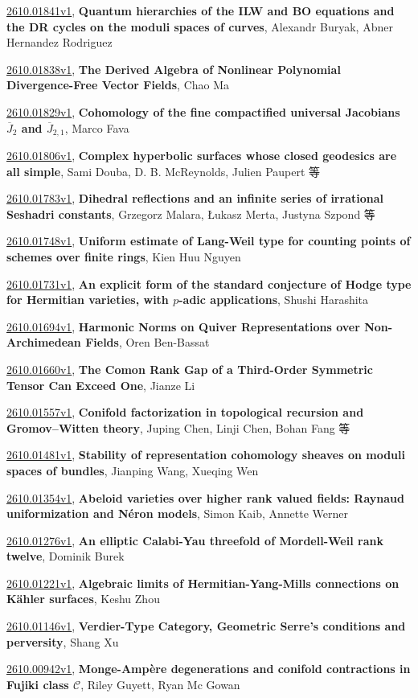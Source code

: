 \documentclass[9pt, a4paper]{article}
\theoremstyle{plain}
\theoremstyle{definition}
\theoremstyle{remark}
\newcommand{\arxiv}[3]{\href{https://arxiv.org/abs/#1}{#1}, \textbf{\textcolor{arxivblue}{#2}}, #3}
\begin{document}
\arxiv{2610.01841v1}{Quantum hierarchies of the ILW and BO equations and the DR cycles on the moduli spaces of curves}{Alexandr Buryak, Abner Hernandez Rodriguez}

\arxiv{2610.01838v1}{The Derived Algebra of Nonlinear Polynomial Divergence-Free Vector Fields}{Chao Ma}

\arxiv{2610.01829v1}{Cohomology of the fine compactified universal Jacobians $\overline{J}_2$ and $\overline{J}_{2,1}$}{Marco Fava}

\arxiv{2610.01806v1}{Complex hyperbolic surfaces whose closed geodesics are all simple}{Sami Douba, D. B. McReynolds, Julien Paupert 等}

\arxiv{2610.01783v1}{Dihedral reflections and an infinite series of irrational Seshadri constants}{Grzegorz Malara, Łukasz Merta, Justyna Szpond 等}

\arxiv{2610.01748v1}{Uniform estimate of Lang-Weil type for counting points of schemes over finite rings}{Kien Huu Nguyen}

\arxiv{2610.01731v1}{An explicit form of the standard conjecture of Hodge type for Hermitian varieties, with $p$-adic applications}{Shushi Harashita}

\arxiv{2610.01694v1}{Harmonic Norms on Quiver Representations over Non-Archimedean Fields}{Oren Ben-Bassat}

\arxiv{2610.01660v1}{The Comon Rank Gap of a Third-Order Symmetric Tensor Can Exceed One}{Jianze Li}

\arxiv{2610.01557v1}{Conifold factorization in topological recursion and Gromov--Witten theory}{Juping Chen, Linji Chen, Bohan Fang 等}

\arxiv{2610.01481v1}{Stability of representation cohomology sheaves on moduli spaces of bundles}{Jianping Wang, Xueqing Wen}

\arxiv{2610.01354v1}{Abeloid varieties over higher rank valued fields: Raynaud uniformization and Néron models}{Simon Kaib, Annette Werner}

\arxiv{2610.01276v1}{An elliptic Calabi-Yau threefold of Mordell-Weil rank twelve}{Dominik Burek}

\arxiv{2610.01221v1}{Algebraic limits of Hermitian-Yang-Mills connections on Kähler surfaces}{Keshu Zhou}

\arxiv{2610.01146v1}{Verdier-Type Category, Geometric Serre's conditions and perversity}{Shang Xu}

\arxiv{2610.00942v1}{Monge-Ampère degenerations and conifold contractions in Fujiki class $\mathcal{C}$}{Riley Guyett, Ryan Mc Gowan}
\end{document}
